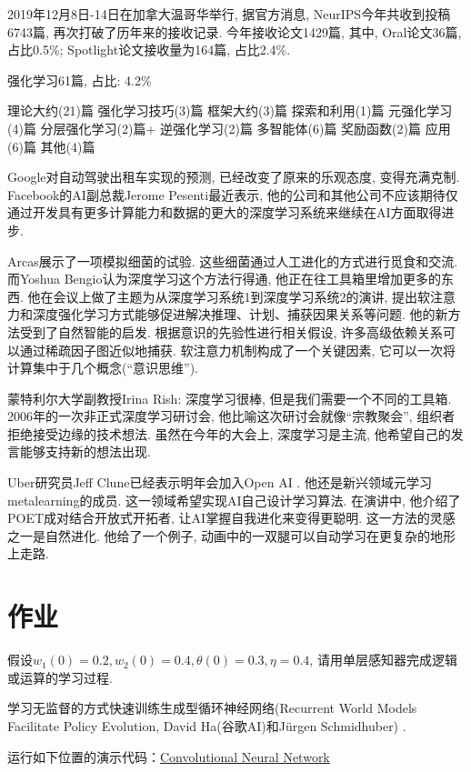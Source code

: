 2019年12月8日-14日在加拿大温哥华举行, 据官方消息, NeurIPS今年共收到投稿6743篇, 再次打破了历年来的接收记录. 今年接收论文1429篇, 其中, Oral论文36篇, 占比0.5\%; Spotlight论文接收量为164篇, 占比2.4\%.

强化学习61篇, 占比: 4.2\%

理论大约(21)篇 强化学习技巧(3)篇 框架大约(3)篇 探索和利用(1)篇 元强化学习(4)篇 分层强化学习(2)篇+ 逆强化学习(2)篇 多智能体(6)篇 奖励函数(2)篇 应用(6)篇 其他(4)篇

Google对自动驾驶出租车实现的预测, 已经改变了原来的乐观态度, 变得充满克制.
Facebook的AI副总裁Jerome Pesenti最近表示, 他的公司和其他公司不应该期待仅通过开发具有更多计算能力和数据的更大的深度学习系统来继续在AI方面取得进步.

Arcas展示了一项模拟细菌的试验. 这些细菌通过人工进化的方式进行觅食和交流.
而Yoshua Bengio认为深度学习这个方法行得通, 他正在往工具箱里增加更多的东西.
他在会议上做了主题为从深度学习系统1到深度学习系统2的演讲, 提出软注意力和深度强化学习方式能够促进解决推理、计划、捕获因果关系等问题.
他的新方法受到了自然智能的启发. 根据意识的先验性进行相关假设, 许多高级依赖关系可以通过稀疏因子图近似地捕获. 软注意力机制构成了一个关键因素, 它可以一次将计算集中于几个概念(“意识思维”).

蒙特利尔大学副教授Irina Rish: 深度学习很棒, 但是我们需要一个不同的工具箱.
2006年的一次非正式深度学习研讨会, 他比喻这次研讨会就像“宗教聚会”, 组织者拒绝接受边缘的技术想法.
虽然在今年的大会上, 深度学习是主流, 他希望自己的发言能够支持新的想法出现.

Uber研究员Jeff Clune已经表示明年会加入Open AI . 他还是新兴领域元学习metalearning的成员. 这一领域希望实现AI自己设计学习算法.
在演讲中, 他介绍了POET成对结合开放式开拓者, 让AI掌握自我进化来变得更聪明. 这一方法的灵感之一是自然进化. 他给了一个例子, 动画中的一双腿可以自动学习在更复杂的地形上走路.
\section{作业}
\begin{think}
    假设$w_1(0)=0.2, w_2(0)=0.4, \theta(0)=0.3, \eta=0.4$, 请用单层感知器完成逻辑或运算的学习过程.
\end{think}

\begin{think}
    学习无监督的方式快速训练生成型循环神经网络(Recurrent World Models Facilitate Policy Evolution, David Ha(谷歌AI)和Jürgen Schmidhuber) \cite{ha2018worldmodels}.
\end{think}

\begin{think}
    运行如下位置的演示代码：\href{https://colab.research.google.com/drive/16a3G7Hh8Pv1X1PhZAUBEnZEkXThzDeHJ#scrollTo=D_a2USyd4giE}{Convolutional Neural Network}
\end{think}

